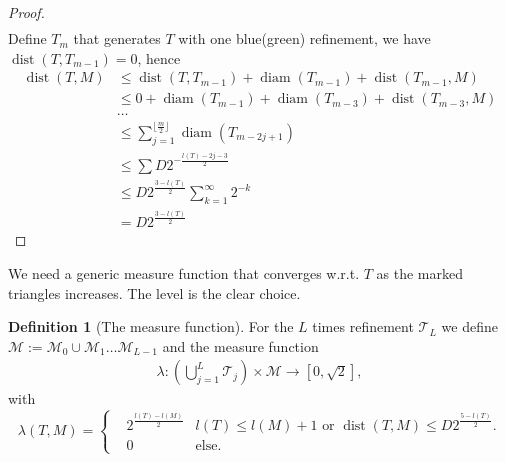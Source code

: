 \documentclass[a4paper,12pt,oneside,fleqn]{book}
\theoremstyle{definition}
\newtheorem{definition}{Definition}[section]
\theoremstyle{remark}
\DeclareMathOperator*{\dist}{dist}
\DeclareMathOperator*{\diam}{diam}
\begin{document}
\begin{proof}
\begin{align*}
\end{align*}
Define $T_m$ that generates $T$ with one blue(green) refinement, we have $\dist(T, T_{m -1}) =0$, hence
\begin{align*}
	\dist(T, M) &\le \dist(T, T_{m-1}) + \diam(T_{m-1}) + \dist(T_{m -1}, M)\\
	& \le 0 + \diam(T_{m -1}) + \diam(T_{m -3})  + \dist(T_{m -3}, M)\\
	& \dots \\
	& \le \sum_{j = 1}^{\lfloor \frac{m}{2} \rfloor} \diam(T_{m - 2j + 1})\\
	&  \le \sum D 2^{-\frac{l(T) - 2j - 3}{2}} \\
	& \le D 2^{\frac{3 - l(T)}{2}} \sum_{k = 1}^\infty 2^{-k}\\
	& = D 2^{\frac{3 - l(T)}{2}}
\end{align*}
\end{proof}

We need a generic measure function that converges w.r.t. $T$ as the marked triangles increases. The level is the clear choice. 
\begin{definition}[The measure function]
For the $L$ times refinement $\mathcal{T}_L$ we define $\mathcal{M}:= \mathcal{M}_0 \cup \mathcal{M}_1 \dots \mathcal{M}_{L -1}$ and the measure function
\begin{align*}
	\lambda: (\bigcup_{j = 1}^L \mathcal{T}_j) \times \mathcal{M} \rightarrow [0, \sqrt{2}],
\end{align*}
with
\begin{equation}
\lambda(T, M) =  \left\{
	\begin{aligned}
		& 2^{\frac{l(T) - l(M)}{2}}  & l(T) \le l(M) + 1 \text{ or } \dist (T, M) \le D 2^{ \frac{5 - l(T)}{2}}. \\
		& 0 &\text{else}.
	\end{aligned}
	\right.
\end{equation}
\end{definition}
\end{document}
